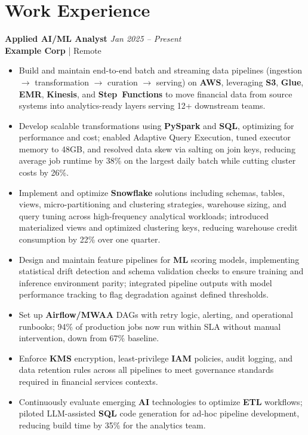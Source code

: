 \documentclass[\rFontPt pt,letterpaper]{extarticle}
\newcommand{\rEntryHead}[1]{\needspace{#1\baselineskip}}
\begin{document}
\section{Work Experience}
\rEntryHead{4}
\textbf{Applied AI/ML Analyst} \hfill \textit{Jan 2025 -- Present}\\
\textbf{Example Corp} | Remote
\vspace{0pt}
\begin{itemize}
\item Build and maintain end-to-end batch and streaming data pipelines (ingestion $\rightarrow$ transformation $\rightarrow$ curation $\rightarrow$ serving) on \textbf{\mbox{AWS}}, leveraging \textbf{\mbox{S3}}, \textbf{\mbox{Glue}}, \textbf{\mbox{EMR}}, \textbf{\mbox{Kinesis}}, and \textbf{\mbox{Step Functions}} to move financial data from source systems into analytics-ready layers serving 12+ downstream teams.
\item Develop scalable transformations using \textbf{\mbox{PySpark}} and \textbf{\mbox{SQL}}, optimizing for performance and cost; enabled Adaptive Query Execution, tuned executor memory to 48GB, and resolved data skew via salting on join keys, reducing average job runtime by 38\% on the largest daily batch while cutting cluster costs by 26\%.
\item Implement and optimize \textbf{\mbox{Snowflake}} solutions including schemas, tables, views, micro-partitioning and clustering strategies, warehouse sizing, and query tuning across high-frequency analytical workloads; introduced materialized views and optimized clustering keys, reducing warehouse credit consumption by 22\% over one quarter.
\item Design and maintain feature pipelines for \textbf{\mbox{ML}} scoring models, implementing statistical drift detection and schema validation checks to ensure training and inference environment parity; integrated pipeline outputs with model performance tracking to flag degradation against defined thresholds.
\item Set up \textbf{\mbox{Airflow/MWAA}} DAGs with retry logic, alerting, and operational runbooks; 94\% of production jobs now run within SLA without manual intervention, down from 67\% baseline.
\item Enforce \textbf{\mbox{KMS}} encryption, least-privilege \textbf{\mbox{IAM}} policies, audit logging, and data retention rules across all pipelines to meet governance standards required in financial services contexts.
\item Continuously evaluate emerging \textbf{\mbox{AI}} technologies to optimize \textbf{\mbox{ETL}} workflows; piloted LLM-assisted \textbf{\mbox{SQL}} code generation for ad-hoc pipeline development, reducing build time by 35\% for the analytics team.
\end{itemize}
\end{document}
